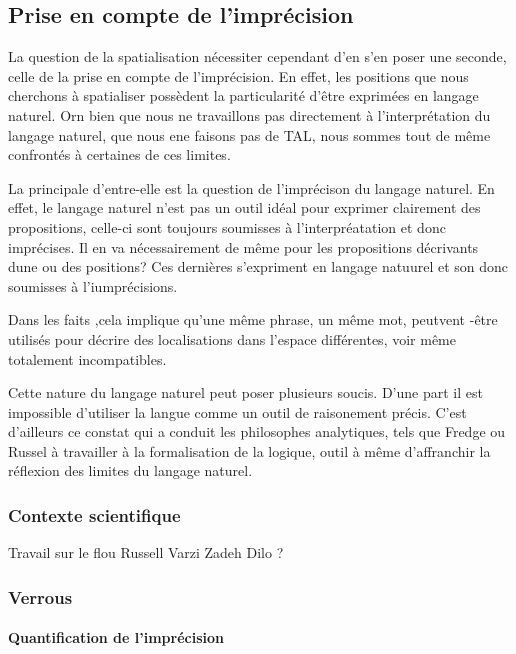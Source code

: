 \subsection{Prise en compte de l'imprécision}
\label{subsec:2-1-2}

La question de la spatialisation nécessiter cependant d'en s'en poser
une seconde, celle de la prise en compte de l'imprécision. En effet,
les positions que nous cherchons à spatialiser possèdent la
particularité d'être exprimées en langage naturel. Orn bien que nous
ne travaillons pas directement à l'interprétation du langage naturel,
\ie que nous ene faisons pas de TAL, nous sommes tout de même
confrontés à certaines de ces limites.

La principale d'entre-elle est la question de l'imprécison du langage
naturel. En effet, le langage naturel n'est pas un outil idéal pour
exprimer clairement des propositions, celle-ci sont toujours
soumisses à l'interpréatation et donc imprécises. Il en va
nécessairement de même pour les propositions décrivants dune ou des
positions? Ces dernières s'expriment en langage natuurel et son donc
soumisses à l'iumprécisions.

Dans les faits ,cela implique qu'une même phrase, un même mot,
peutvent -être utilisés pour décrire des localisations dans l'espace
différentes, voir même totalement incompatibles.

Cette nature du langage naturel peut poser plusieurs soucis. D'une
part il est impossible d'utiliser la langue comme un outil de
raisonement précis. C'est d'ailleurs ce constat qui a conduit les
philosophes analytiques, tels que Fredge ou Russel à travailler à la
formalisation de la logique, outil à même d'affranchir la réflexion
des limites du langage naturel.



\subsubsection{Contexte scientifique}

Travail sur le flou
Russell
Varzi
Zadeh
Dilo ?


\subsubsection{Verrous}

\paragraph{Quantification de l'imprécision}


